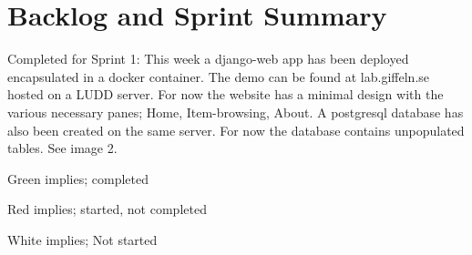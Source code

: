 \newpage

\section{Backlog and Sprint Summary}

Completed for Sprint 1: This week a django-web app has been deployed
encapsulated in a docker container. The demo can be found at lab.giffeln.se
hosted on a LUDD server. For now the website has a minimal design with the
various necessary panes; Home, Item-browsing, About. A postgresql database
has also been created on the same server. For now the database contains
unpopulated tables. See image 2.

Green implies; completed

Red implies; started, not completed 

White implies; Not started

